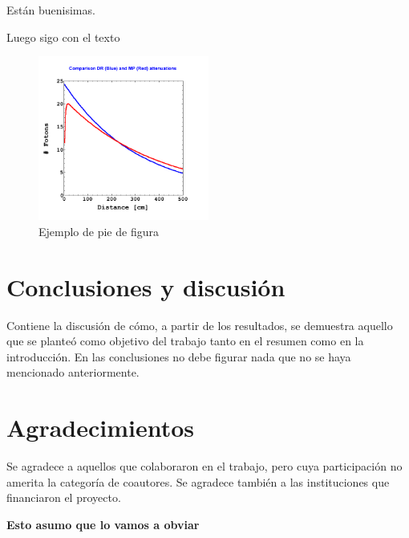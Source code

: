 \documentclass[twoside]{article}
\begin{document}
\begin{multicols}{2}
Están buenisimas.

Luego sigo con el texto 



\begin{figure}[H]
  \centerline{
    \includegraphics[width=0.5\textwidth]{./figs/Atenuacion.png}}
  \caption{\footnotesize {Ejemplo de pie de figura}}
  \label{fig:atenuacion}
\end{figure}



\section{Conclusiones y discusi\'on}

Contiene la discusión de cómo, a partir de los resultados, se demuestra aquello que se planteó como objetivo del trabajo tanto en el resumen como en la introducción. En las conclusiones no debe figurar nada que no se haya mencionado anteriormente. 

\section{Agradecimientos}

Se agradece a aquellos que colaboraron en el trabajo, pero cuya participación no amerita la categoría de coautores. Se agradece también a las instituciones que financiaron el proyecto. 

\textbf{Esto asumo que lo vamos a obviar}

\begin{thebibliography}{99} %


\end{thebibliography}
\end{multicols}
\end{document}
